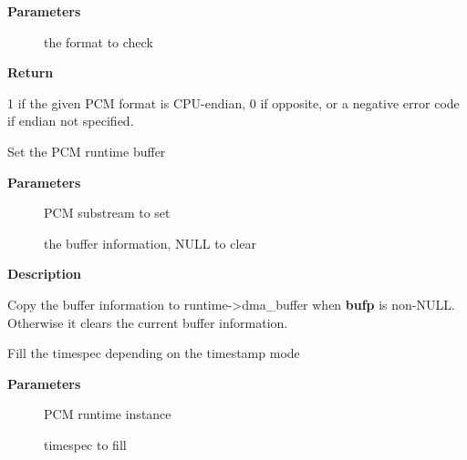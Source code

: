 \documentclass[a4paper,8pt,english]{sphinxmanual}
\begin{document}
\textbf{Parameters}
\begin{description}
\item[{}] \leavevmode
the format to check

\end{description}

\textbf{Return}

1 if the given PCM format is CPU-endian, 0 if
opposite, or a negative error code if endian not specified.

\begin{fulllineitems}
\label{sound/kernel-api/alsa-driver-api:c.snd_pcm_set_runtime_buffer}
Set the PCM runtime buffer

\end{fulllineitems}


\textbf{Parameters}
\begin{description}
\item[{}] \leavevmode
PCM substream to set

\item[{}] \leavevmode
the buffer information, NULL to clear

\end{description}

\textbf{Description}

Copy the buffer information to runtime-\textgreater{}dma\_buffer when \textbf{bufp} is non-NULL.
Otherwise it clears the current buffer information.

\begin{fulllineitems}
\label{sound/kernel-api/alsa-driver-api:c.snd_pcm_gettime}
Fill the timespec depending on the timestamp mode

\end{fulllineitems}


\textbf{Parameters}
\begin{description}
\item[{}] \leavevmode
PCM runtime instance

\item[{}] \leavevmode
timespec to fill

\end{description}
\end{document}
